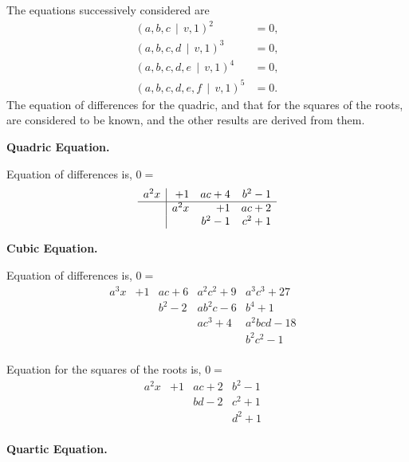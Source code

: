 \documentclass[12pt,a4paper]{article}
\theoremstyle{plain}
\begin{document}
The  equations  successively  considered  are
\begin{align*}
(a, b, c \,\!\!\mid\, v, 1)^2 &= 0, \\
(a, b, c, d \,\!\!\mid\, v, 1)^3 &= 0, \\
(a, b, c, d, e \,\!\!\mid\, v, 1)^4 &= 0, \\
(a, b, c, d, e, f \,\!\!\mid\, v, 1)^5 &= 0.
\end{align*}
The  equation  of  differences  for  the  quadric,  and  that  for  the  squares  of  the  roots,
are  considered  to  be  known,  and  the  other  results  are  derived  from  them.

\medskip
\noindent\textbf{Quadric Equation.}

\noindent
Equation  of  differences  is,  $0 =$
\[
\begin{array}{r|rrr}
a^2 x & +1 & ac + 4 & b^2 - 1 \\
\hline
& a^2 x & +1 & ac + 2 \\
& & b^2 - 1 & c^2 + 1 \\
\end{array}
\]

\medskip
\noindent\textbf{Cubic Equation.}

\noindent
Equation  of  differences  is,  $0 =$
\[
\begin{array}{r|rrrrr}
a^3 x & +1 & ac + 6 & a^2 c^2 + 9 & a^3 c^3 + 27 & \\
& & b^2 - 2 & ab^2 c - 6 & b^4 + 1 & \\
& & & ac^3 + 4 & a^2 bc d - 18 & \\
& & & & b^2 c^2 - 1 & \\
\end{array}
\]

\noindent
Equation  for  the  squares  of  the  roots  is,  $0 =$
\[
\begin{array}{r|rrrr}
a^2 x & +1 & ac + 2 & b^2 - 1 & \\
& & bd - 2 & c^2 + 1 & \\
& & & d^2 + 1 & \\
\end{array}
\]

\newpage
\noindent\textbf{Quartic Equation.}
\end{document}
